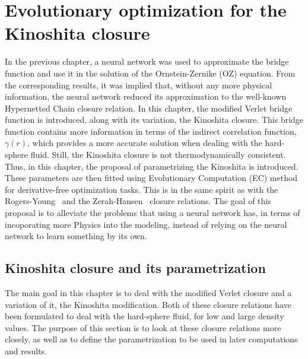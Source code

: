 \chapter{Evolutionary optimization for the Kinoshita closure}
\label{Cap5}

In the previous chapter, a neural network was used to approximate the bridge function and 
use it in the solution of the Ornstein-Zernike (OZ) equation. From the corresponding 
results, it was implied that, without any more physical information, the neural network 
reduced its approximation to the well-known Hypernetted Chain closure relation. In this 
chapter, the modified Verlet bridge function is introduced, along with its variation, the 
Kinoshita closure. This bridge function contains more information in terms of the indirect 
correlation function, \(\gamma(r)\), which provides a more accurate solution when dealing 
with the hard-sphere fluid. Still, the Kinoshita closure is not thermodynamically 
consistent. Thus, in this chapter, the proposal of parametrizing the Kinoshita is 
introduced. These parameters are then fitted using Evolutionary Computation (EC) method for 
derivative-free optimization tasks. This is in the same spirit as with the 
Rogers-Young~\cite{rogersNewThermodynamicallyConsistent1984b} and the 
Zerah-Hansen~\cite{zerahSelfConsistentIntegral1986} closure relations. The goal of this 
proposal is to alleviate the problems that using a neural network has, in terms of 
incoporating more Physics into the modeling, instead of relying on the neural network to 
learn something by its own.

\section{Kinoshita closure and its parametrization}
The main goal in this chapter is to deal with the modified Verlet closure and a variation 
of it, the Kinoshita modification. Both of these closure relations have been formulated to 
deal with the hard-sphere fluid, for low and large density values. The purpose of this 
section is to look at these closure relations more closely, as well as to define the 
parametrization to be used in later computations and results.


